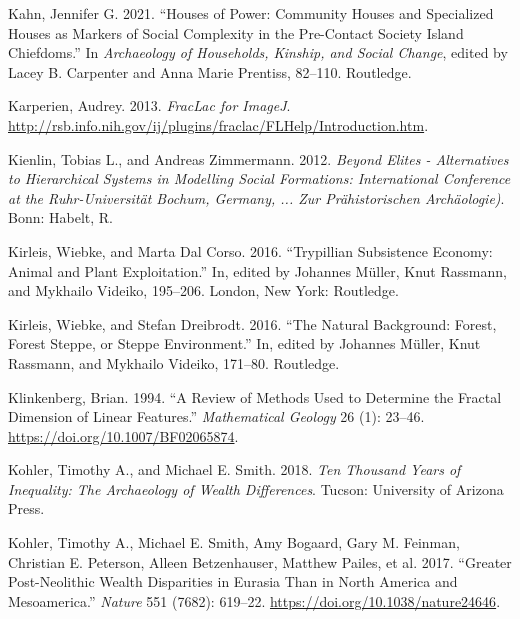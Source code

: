 \documentclass[
  12pt,
  a4paper, twoside]{book}
\newlength{\cslhangindent}
\newlength{\cslentryspacingunit} %
\newenvironment{CSLReferences}[2] %
 {%
  \setlength{\parindent}{0pt}
  \ifodd #1
  \let\oldpar\par
  \def\par{\hangindent=\cslhangindent\oldpar}
  \fi
  \setlength{\parskip}{#2\cslentryspacingunit}
 }%
 {}
\begin{document}
\begin{CSLReferences}{1}{0}
\leavevmode{}%
Kahn, Jennifer G. 2021. {``Houses of Power: {Community} Houses and Specialized Houses as Markers of Social Complexity in the Pre-Contact {Society Island} Chiefdoms.''} In \emph{Archaeology of {Households}, {Kinship}, and {Social Change}}, edited by Lacey B. Carpenter and Anna Marie Prentiss, 82--110. {Routledge}.

\leavevmode{}%
Karperien, Audrey. 2013. \emph{FracLac for ImageJ}. \url{http://rsb.info.nih.gov/ij/plugins/fraclac/FLHelp/Introduction.htm}.

\leavevmode{}%
Kienlin, Tobias L., and Andreas Zimmermann. 2012. \emph{Beyond Elites - Alternatives to Hierarchical Systems in Modelling Social Formations: International Conference at the Ruhr-Universität Bochum, Germany, ... Zur Prähistorischen Archäologie)}. Bonn: Habelt, R.

\leavevmode{}%
Kirleis, Wiebke, and Marta Dal Corso. 2016. {``Trypillian Subsistence Economy: Animal and Plant Exploitation.''} In, edited by Johannes Müller, Knut Rassmann, and Mykhailo Videiko, 195--206. London, New York: Routledge.

\leavevmode{}%
Kirleis, Wiebke, and Stefan Dreibrodt. 2016. {``The Natural Background: Forest, Forest Steppe, or Steppe Environment.''} In, edited by Johannes Müller, Knut Rassmann, and Mykhailo Videiko, 171--80. Routledge.

\leavevmode{}%
Klinkenberg, Brian. 1994. {``A Review of Methods Used to Determine the Fractal Dimension of Linear Features.''} \emph{Mathematical Geology} 26 (1): 23--46. \url{https://doi.org/10.1007/BF02065874}.

\leavevmode{}%
Kohler, Timothy A., and Michael E. Smith. 2018. \emph{Ten Thousand Years of Inequality: The Archaeology of Wealth Differences}. Tucson: University of Arizona Press.

\leavevmode{}%
Kohler, Timothy A., Michael E. Smith, Amy Bogaard, Gary M. Feinman, Christian E. Peterson, Alleen Betzenhauser, Matthew Pailes, et al. 2017. {``Greater Post-Neolithic Wealth Disparities in Eurasia Than in North America and Mesoamerica.''} \emph{Nature} 551 (7682): 619--22. \url{https://doi.org/10.1038/nature24646}.


\end{CSLReferences}
\end{document}
